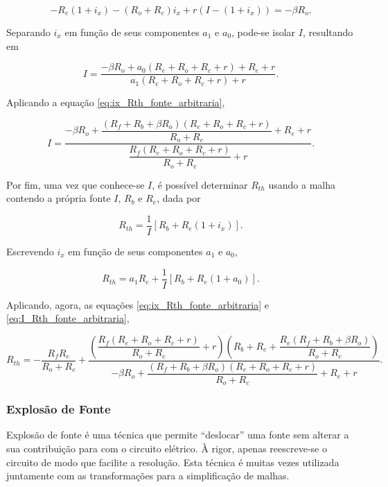 \documentclass{article}
\numberwithin{equation}{section}
\begin{document}
\begin{equation*}
    -R_e(1+i_x)-(R_o+R_c)i_x+r(I-(1+i_x)) = -\beta R_o.
\end{equation*}

\noindent Separando $i_x$ em função de seus componentes $a_1$ e $a_0$, pode-se isolar $I$, resultando em

\begin{equation*}
    I=\dfrac{-\beta R_o + a_0 (R_e+R_o+R_c+r) + R_e+r}{a_1 (R_e+R_o+R_c+r)+r}.
\end{equation*}

\noindent Aplicando a equação \eqref{eq:ix_Rth_fonte_arbitraria},

\begin{equation}
    I=\dfrac{-\beta R_o + \dfrac{(R_f+R_b+\beta R_o)(R_e+R_o+R_c+r)}{R_o+R_c} + R_e+r}{\dfrac{R_{f}(R_e+R_o+R_c+r)}{R_o+R_c}+r}. \label{eq:I_Rth_fonte_arbitraria}
\end{equation}

\noindent Por fim, uma vez que conhece-se $I$, é possível determinar $R_{th}$ usando a malha contendo a própria fonte $I$, $R_b$ e $R_e$, dada por

\begin{equation*}
    R_{th} = \dfrac{1}{I} [R_b + R_e(1+i_x)].
\end{equation*}

\noindent Escrevendo $i_x$ em função de seus componentes $a_1$ e $a_0$,

\begin{equation*}
    R_{th} = a_1 R_e + \dfrac{1}{I} [R_b + R_e(1+a_0)].
\end{equation*}

\noindent Aplicando, agora, as equações \eqref{eq:ix_Rth_fonte_arbitraria} e \eqref{eq:I_Rth_fonte_arbitraria},

\begin{equation}
    R_{th}= -\dfrac{R_{f}R_e}{R_o+R_c} + \dfrac{\left(\dfrac{R_{f}(R_e+R_o+R_c+r)}{R_o+R_c}+r\right)\left(R_b+R_e + \dfrac{R_e(R_{f}+R_b+\beta R_o)}{R_o + R_c}\right)}{-\beta R_o + \dfrac{(R_f+R_b+\beta R_o)(R_e+R_o+R_c+r)}{R_o+R_c} + R_e+r}.
\end{equation}

\subsubsection{Explosão de Fonte}
\label{subsubsec:explosion}
Explosão de fonte é uma técnica que permite ``deslocar'' uma fonte sem alterar a sua contribuição para com o circuito elétrico. À rigor, apenas reescreve-se o circuito de modo que facilite a resolução. Esta técnica é muitas vezes utilizada juntamente com as transformações para a simplificação de malhas.
\end{document}
